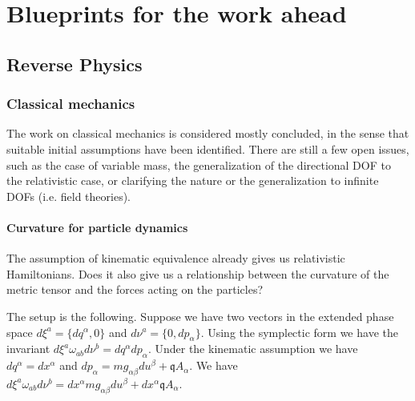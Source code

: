 \documentclass[11pt,letterpaper,fleqn]{memoir} %
\begin{document}
\newpage
\endgroup









\part{Blueprints for the work ahead}

\begingroup
\pagestyle{plain}



\newpage
\endgroup

\chapter{Reverse Physics}

\section{Classical mechanics}

The work on classical mechanics is considered mostly concluded, in the sense that suitable initial assumptions have been identified. There are still a few open issues, such as the case of variable mass, the generalization of the directional DOF to the relativistic case, or clarifying the nature or the generalization to infinite DOFs (i.e. field theories).

\subsection{Curvature for particle dynamics}

The assumption of kinematic equivalence already gives us relativistic Hamiltonians. Does it also give us a relationship between the curvature of the metric tensor and the forces acting on the particles?

The setup is the following. Suppose we have two vectors in the extended phase space $d\xi^a = \{dq^\alpha, 0\}$ and $d\nu^a = \{0, dp_\alpha\}$. Using the symplectic form we have the invariant $d\xi^a \omega_{ab}d\nu^b = dq^\alpha dp_\alpha$. Under the kinematic assumption we have $dq^\alpha = dx^\alpha$ and $dp_\alpha = mg_{\alpha\beta}du^\beta + \mathfrak{q} A_\alpha$. We have $d\xi^a \omega_{ab}d\nu^b = dx^\alpha m g_{\alpha\beta} du^\beta + dx^\alpha \mathfrak{q} A_\alpha$.
\end{document}
